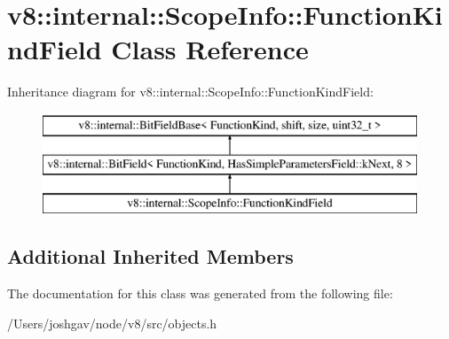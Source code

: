 \hypertarget{classv8_1_1internal_1_1_scope_info_1_1_function_kind_field}{}\section{v8\+:\+:internal\+:\+:Scope\+Info\+:\+:Function\+Kind\+Field Class Reference}
\label{classv8_1_1internal_1_1_scope_info_1_1_function_kind_field}
Inheritance diagram for v8\+:\+:internal\+:\+:Scope\+Info\+:\+:Function\+Kind\+Field\+:\begin{figure}[H]
\begin{center}
\leavevmode
\includegraphics[height=3.000000cm]{classv8_1_1internal_1_1_scope_info_1_1_function_kind_field}
\end{center}
\end{figure}
\subsection*{Additional Inherited Members}


The documentation for this class was generated from the following file\+:\begin{DoxyCompactItemize}
\item 
/\+Users/joshgav/node/v8/src/objects.\+h\end{DoxyCompactItemize}
